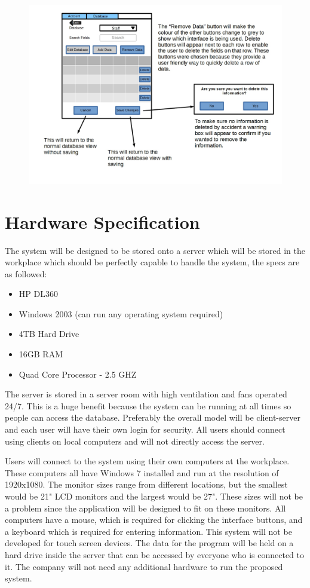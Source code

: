 \begin{figure}[H]
\includegraphics[width=\textwidth,angle=90]{GUI_Design14.jpg}
\caption{}
\end{figure}


\section {Hardware Specification}

The system will be designed to be stored onto a server which will be stored in the workplace which should be perfectly capable to handle the system, the specs are as followed:
\begin{itemize}
\item HP DL360
\item Windows 2003 (can run any operating system required)
\item 4TB Hard Drive
\item 16GB RAM
\item Quad Core Processor - 2.5 GHZ
\end{itemize}
The server is stored in a server room with high ventilation and fans operated 24/7. This is a huge benefit because the system can be running at all times so people can access the database. Preferably the overall model will be client-server and each user will have their own login for security. All users should connect using clients on local computers and will not directly access the server.

Users will connect to the system using their own computers at the workplace. These computers all have Windows 7 installed and run at the resolution of 1920x1080. The monitor sizes range from different locations, but the smallest would be 21" LCD monitors and the largest would be 27". These sizes will not be a problem since the application will be designed to fit on these monitors. All computers have a mouse, which is required for clicking the interface buttons, and a keyboard which is required for entering information. This system will not be developed for touch screen devices. The data for the program will be held on a hard drive inside the server that can be accessed by everyone who is connected to it. The company will not need any additional hardware to run the proposed system.

